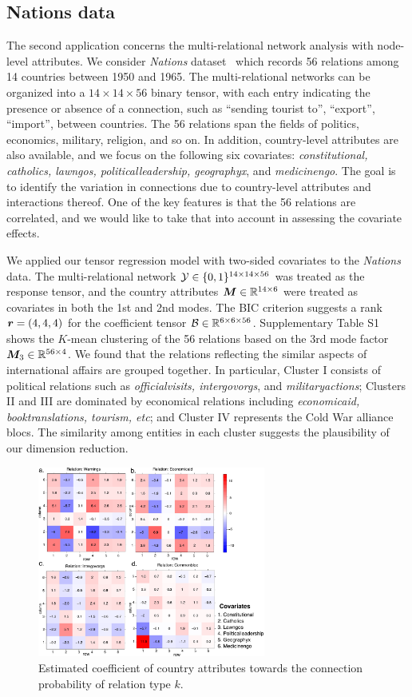 \documentclass[twoside]{article}
\theoremstyle{plain}
\theoremstyle{definition}
\begin{document}
\subsection{Nations data}
The second application concerns the multi-relational network analysis with node-level attributes. We consider \emph{Nations} dataset~\cite{nickel2011three} which records 56 relations among 14 countries between 1950 and 1965. The multi-relational networks can be organized into a $14 \times 14 \times 56$ binary tensor, with each entry indicating the presence or absence of a connection, such as ``sending tourist to'', ``export'', ``import'', between countries. The 56 relations span the fields of politics, economics, military, religion, and so on. In addition, country-level attributes are also available, and we focus on the following six covariates: \emph{constitutional, catholics, lawngos, politicalleadership, geographyx}, and \emph{medicinengo}. The goal is to identify the variation in connections due to country-level attributes and interactions thereof. One of the key features is that the 56 relations are correlated, and we would like to take that into account in assessing the covariate effects. 

We applied our tensor regression model with two-sided covariates to the \emph{Nations} data. The multi-relational network $\mathcal{Y}\in\{0,1\}^{14\times 14\times 56}$ was treated as the response tensor, and the country attributes $\bm M\in\mathbb{R}^{14\times 6}$ were treated as covariates in both the 1st and 2nd modes. The BIC criterion suggests a rank $\bm{r}=(4,4,4)$ for the coefficient tensor $\mathcal{B}\in\mathbb{R}^{6\times 6 \times 56}$. Supplementary Table S1 shows the $K$-mean clustering of the 56 relations based on the 3rd mode factor $\bm M_3\in\mathbb{R}^{56\times 4}$. We found that the relations reflecting the similar aspects of international affairs are grouped together. In particular, Cluster I consists of political relations such as \emph{officialvisits, intergovorgs}, and \emph{militaryactions}; Clusters II and III are dominated by economical relations including \emph{economicaid, booktranslations, tourism, etc}; and Cluster IV represents the Cold War alliance blocs. The similarity among entities in each cluster suggests the plausibility of our dimension reduction. 

\begin{figure}[t]
\includegraphics[width=7.5cm]{coef.pdf}
\caption{Estimated coefficient of country attributes towards the connection probability of relation type $k$.}\label{fig:est}
\end{figure}
\end{document}
